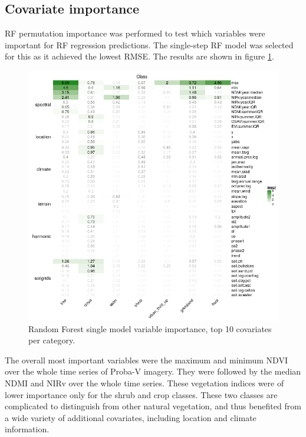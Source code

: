 \documentclass[a4paper,10pt]{article}
\begin{document}
\subsection{Covariate importance}

\Gls{RF} permutation importance was performed to test which variables were important for \gls{RF} regression predictions.
The single-step \gls{RF} model was selected for this as it achieved the lowest \gls{RMSE}.
The results are shown in figure \ref{fig-varimp}.

\begin{figure}
    \includegraphics[width=\textwidth]{article-figures/heatmaps/2020-05-12-varimp-heatmap-top10}
    \caption{Random Forest single model variable importance, top 10 covariates per category.}
    \label{fig-varimp}
\end{figure}

The overall most important variables were the maximum and minimum NDVI over the whole time series of Proba-V imagery.
They were followed by the median NDMI and NIRv over the whole time series.
These vegetation indices were of lower importance only for the shrub and crop classes.
These two classes are complicated to distinguish from other natural vegetation, and thus benefited from a wide variety of additional covariates, including location and climate information.
\end{document}
